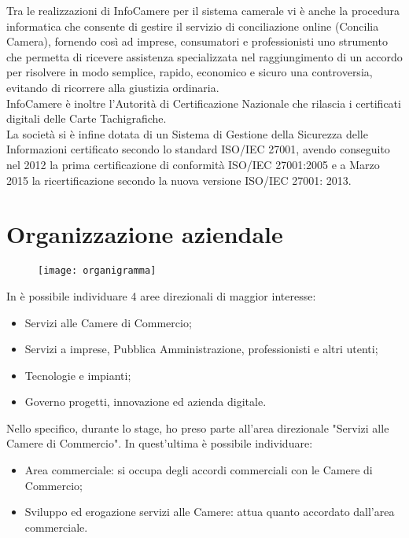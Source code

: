	Tra le realizzazioni di InfoCamere per il sistema camerale vi è anche la procedura informatica che consente di gestire il servizio di conciliazione online (Concilia Camera), fornendo così ad imprese, consumatori e professionisti uno strumento che permetta di ricevere assistenza specializzata nel raggiungimento di un accordo per risolvere in modo semplice, rapido, economico e sicuro una controversia, evitando di ricorrere alla giustizia ordinaria. \\
	InfoCamere è inoltre l'Autorità di Certificazione Nazionale che rilascia i certificati digitali delle Carte Tachigrafiche. \\
	La società si è infine dotata di un Sistema di Gestione della Sicurezza delle Informazioni certificato secondo lo standard ISO/IEC 27001, avendo conseguito nel 2012 la prima certificazione di conformità ISO/IEC 27001:2005 e a Marzo 2015 la ricertificazione secondo la nuova versione ISO/IEC 27001: 2013.

\section{Organizzazione aziendale}
\label{sec:organizzazione_aziendale}

	\begin{figure}[htbp]
		\begin{center}
			\texttt{[image: organigramma]}
		\end{center}
	\end{figure}

	In \nomeAzienda è possibile individuare 4 aree direzionali di maggior interesse:
	\begin{itemize}
		\item{Servizi alle Camere di Commercio;}
		\item{Servizi a imprese, Pubblica Amministrazione, professionisti e altri utenti;}
		\item{Tecnologie e impianti;}
		\item{Governo progetti, innovazione ed azienda digitale.}
	\end{itemize}

	Nello specifico, durante lo stage, ho preso parte all'area direzionale "Servizi alle Camere di Commercio". In quest'ultima è possibile individuare:
	\begin{itemize}
		\item{Area commerciale: si occupa degli accordi commerciali con le Camere di Commercio;}
		\item{Sviluppo ed erogazione servizi alle Camere: attua quanto accordato dall'area commerciale.}
	\end{itemize}

